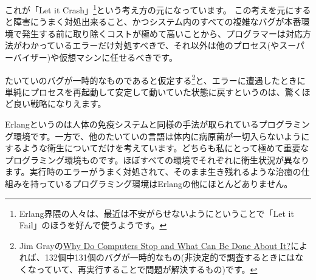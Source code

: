 これが「Let it Crash」\footnote{Erlang界隈の人々は、最近は不安がらせないようにということで「Let it Fail」のほうを好んで使うようです。}という考え方の元になっています。
この考えを元にすると障害にうまく対処出来ること、かつシステム内のすべての複雑なバグが本番環境で発生する前に取り除くコストが極めて高いことから、プログラマーは対応方法がわかっているエラーだけ対処すべきで、それ以外は他のプロセス(やスーパーバイザー)や仮想マシンに任せるべきです。

たいていのバグが一時的なものであると仮定する\footnote{Jim Grayの\href{http://www.hpl.hp.com/techreports/tandem/TR-85.7.html}{Why Do Computers Stop and What Can Be Done About It?}によれば、132個中131個のバグが一時的なもの(非決定的で調査するときにはなくなっていて、再実行することで問題が解決するもの)です。}と、エラーに遭遇したときに単純にプロセスを再起動して安定して動いていた状態に戻すというのは、驚くほど良い戦略になりえます。

Erlangというのは人体の免疫システムと同様の手法が取られているプログラミング環境です。一方で、他のたいていの言語は体内に病原菌が一切入らないようにするような衛生についてだけを考えています。どちらも私にとって極めて重要なプログラミング環境ものです。ほぼすべての環境でそれぞれに衛生状況が異なります。実行時のエラーがうまく対処されて、そのまま生き残れるような治癒の仕組みを持っているプログラミング環境はErlangの他にほとんどありません。

